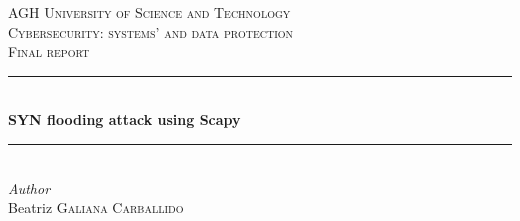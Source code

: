 \documentclass[11pt]{article}
\begin{document}

\begin{titlepage} %
	\newcommand{\HRule}{\rule{\linewidth}{0.5mm}} %
	
	\center %
	
	
	\textsc{\LARGE AGH University of Science and Technology}\\[1.5cm] %
	
	\textsc{\Large Cybersecurity: systems' and data protection}\\[0.5cm] %
	
	\textsc{\large Final report}\\[0.5cm] %
	
	
	\HRule\\[0.4cm]
	
	{\huge\bfseries SYN flooding attack using Scapy}\\[0.4cm] %
	
	\HRule\\[1.5cm]
	
	
	
	
	{\large\textit{Author}}\\
	Beatriz \textsc{Galiana Carballido} %
	
	

\end{titlepage}
\end{document}
